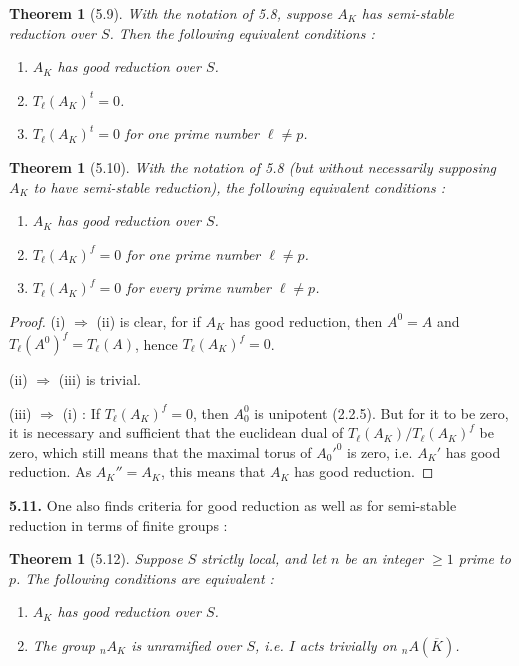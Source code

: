 \documentclass[11pt]{article}
\newtheorem{theoreme}[proposition]{Theorem}
\newcommand{\Tl}{T_{\ell}}
\begin{document}
\begin{theoreme}[5.9]
With the notation of \emph{5.8}, suppose $A_K$ has semi-stable
reduction over $S$. Then the following equivalent conditions :
\begin{enumerate}[label=\emph{(\roman*)}]
\item $A_K$ has \emph{good reduction} over $S$.
\item $\Tl(A_K)^t = 0$.
\item $\Tl(A_K)^t = 0$ for \emph{one} prime number $\ell \neq p$.
\end{enumerate}
\end{theoreme}

\begin{theoreme}[5.10]
With the notation of \emph{5.8} (but without necessarily supposing $A_K$
to have semi-stable reduction), the following equivalent conditions :
\begin{enumerate}[label=\emph{(\roman*)}]
\item $A_K$ has \emph{good reduction} over $S$.
\item $\Tl(A_K)^f = 0$ for \emph{one} prime number $\ell \neq p$.
\item $\Tl(A_K)^f = 0$ for \emph{every} prime number $\ell \neq p$.
\end{enumerate}
\end{theoreme}

\begin{proof}
(i) $\Rightarrow$ (ii) is clear, for if $A_K$ has good reduction, then
$A^0 = A$ and $\Tl(A^0)^f = \Tl(A)$, hence $\Tl(A_K)^f = 0$.

(ii) $\Rightarrow$ (iii) is trivial.

(iii) $\Rightarrow$ (i) : If $\Tl(A_K)^f = 0$, then $A_0^0$ is
unipotent (2.2.5). But for it to be zero, it is necessary and
sufficient that the euclidean dual of $\Tl(A_K)/\Tl(A_K)^f$ be zero,
which still means that the maximal torus of $A_0'^0$ is zero, i.e.
$A_K'$ has good reduction. As $A_K'' = A_K$, this means that $A_K$ has
good reduction.
\end{proof}

\medskip

\noindent\textbf{5.11.} One also finds criteria for good reduction as
well as for semi-stable reduction in terms of finite groups :

\begin{theoreme}[5.12]
Suppose $S$ strictly local, and let $n$ be an integer $\geq 1$ prime to
$p$. The following conditions are equivalent :
\begin{enumerate}[label=\emph{(\roman*)}]
\item $A_K$ has \emph{good reduction} over $S$.
\item The group ${}_n A_K$ is unramified over $S$, i.e. $I$ acts
trivially on ${}_n A(\overline{K})$.
\end{enumerate}
\end{theoreme}
\end{document}
